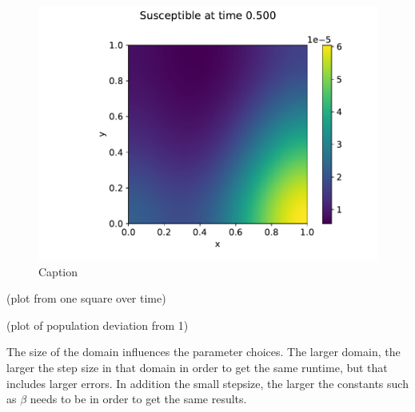 \begin{figure}
    \centering
    \includegraphics[width=\textwidth]{report/Images/plots/plot-i_t=5000-0.pdf}
    \caption{Caption}
    \label{fig:enter-label}
\end{figure}

(plot from one square over time)

(plot of population deviation from 1)

The size of the domain influences the parameter choices. The larger domain, the larger the step size in that domain in order to get the same runtime, but that includes larger errors.
In addition the small stepsize, the larger the constants such as $\beta$ needs to be in order to get the same results.



